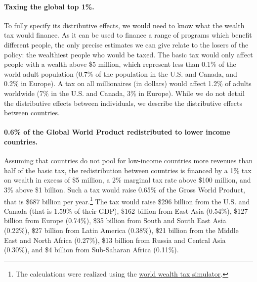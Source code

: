 \documentclass[12pt,english]{article}
\begin{document}
\paragraph{Taxing the global top 1\%.} To fully specify its distributive effects, we would need to know what the wealth tax would finance. As it can be used to finance a range of programs which benefit different people, the only precise estimates we can give relate to the losers of the policy: the wealthiest people who would be taxed. The basic tax would only affect people with a wealth above \$5 million, which represent less than 0.1\% of the world adult population (0.7\% of the population in the U.S. and Canada, and 0.2\% in Europe). A tax on all millionaires (in dollars) would affect 1.2\% of adults worldwide (7\% in the U.S. and Canada, 3\% in Europe). While we do not detail the distributive effects between individuals, we describe the distributive effects between countries.

\paragraph{0.6\% of the Global World Product redistributed to lower income countries.} Assuming that countries do not pool for low-income countries more revenues than half of the basic tax, the redistribution between countries is financed by a 1\% tax on wealth in excess of \$5 million, a 2\% marginal tax rate above \$100 million, and 3\% above \$1 billion. Such a tax would raise 0.65\% of the Gross World Product, that is \$687 %
billion per year.\footnote{The calculations were realized using the \href{https://wid.world/world-wealth-tax-simulator/}{world wealth tax simulator}.} The tax would raise \$296 billion from the U.S. and Canada (that is 1.59\% of their GDP), 
\$162 billion from East Asia (0.54\%), \$127 billion from Europe (0.74\%), \$35 billion from South and South East Asia (0.22\%), \$27 billion from Latin America (0.38\%), \$21 billion from the Middle East and North Africa (0.27\%), \$13 billion from Russia and Central Asia (0.30\%), and \$4 billion from Sub-Saharan Africa (0.11\%). 
\end{document}
